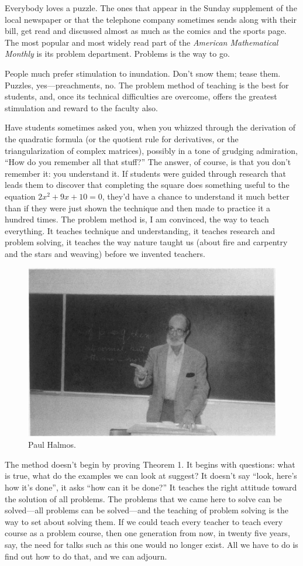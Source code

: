 \documentclass[a4paper,12pt]{article}
\begin{document}
Everybody loves a puzzle.  The ones that appear in the Sunday supplement
of the local newspaper or that the telephone company sometimes sends along
with their bill, get read and discussed almost as much as the comics and
the sports page.  The most popular and most widely read part of the
\emph{American Mathematical Monthly} is its problem department.  Problems is the
way to go.

People much prefer stimulation to inundation.  Don’t snow them; tease them.
Puzzles, yes—preachments, no.  The problem method of teaching is the best
for students, and, once its technical difficulties are overcome, offers the
greatest stimulation and reward to the faculty also.

Have students sometimes asked you, when you whizzed through the derivation
of the quadratic formula (or the quotient rule for derivatives, or the
triangularization of complex matrices), possibly in a tone of grudging
admiration, “How do you remember all that stuff?”  The answer, of course,
is that you don’t remember it: you understand it.  If students were guided
through research that leads them to discover that completing the square
does something useful to the equation \(2x^2 + 9x + 10 = 0\), they’d have
a chance to understand it much better than if they were just shown the
technique and then made to practice it a hundred times.  The problem
method is, I am convinced, the way to teach everything.  It teaches
technique and understanding, it teaches research and problem solving, it
teaches the way nature taught us (about fire and carpentry and the stars
and weaving) before we invented teachers.

\begin{figure}[htbp]
\centering
\includegraphics[width=.6\linewidth]{Halmos-Teaching.png}
\caption{\label{fig:halmos-teaching}Paul Halmos.}
\end{figure}

The method doesn’t begin by proving Theorem 1.  It begins with questions:
what is true, what do the examples we can look at suggest?  It doesn’t say
“look, here’s how it’s done”, it asks “how can it be done?”  It teaches
the right attitude toward the solution of all problems.  The problems that
we came here to solve can be solved—all problems can be solved—and the
teaching of problem solving is the way to set about solving them.  If we
could teach every teacher to teach every course as a problem course, then
one generation from now, in twenty five years, say, the need for talks
such as this one would no longer exist.  All we have to do is find out how
to do that, and we can adjourn.
\end{document}
